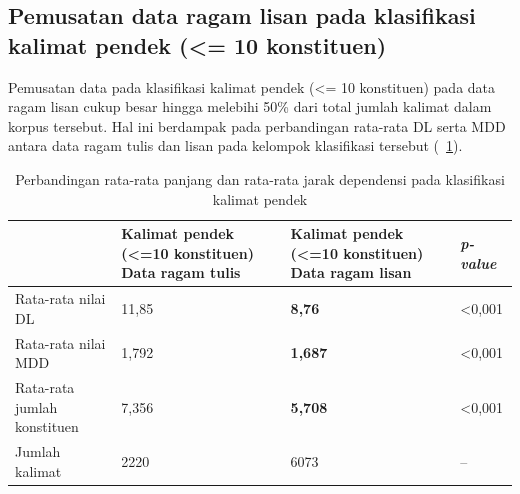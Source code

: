 \subsection{Pemusatan data ragam lisan pada klasifikasi kalimat pendek (\textless= 10 konstituen)}
Pemusatan data pada klasifikasi kalimat pendek (\textless= 10 konstituen) pada data ragam lisan cukup besar hingga melebihi 50\% dari total jumlah kalimat dalam korpus tersebut. Hal ini berdampak pada perbandingan rata-rata DL serta MDD antara data ragam tulis dan lisan pada kelompok klasifikasi tersebut (\tab~\ref{tab:DL_MDD_pendek}).

\begin{table}
\begin{center}
\begin{small}
\caption{Perbandingan rata-rata panjang dan rata-rata jarak dependensi pada klasifikasi kalimat pendek }\label{tab:DL_MDD_pendek}
  \begin{tabular}{ | p{3.2cm} | p{3.2cm} | p{3.2cm} | p{2cm} |}
    \hline
 & Kalimat pendek \newline (\textless =10 konstituen) \newline Data ragam tulis & Kalimat pendek \newline (\textless =10 konstituen) \newline Data ragam lisan & \textit{p-value} \\ \hline
 Rata-rata nilai DL & 11,85 & \textbf{8,76} & \textless 0,001 \\ \hline
 Rata-rata nilai MDD & 1,792 & \textbf{1,687} & \textless 0,001 \\ \hline
 Rata-rata jumlah konstituen & 7,356 & \textbf{5,708} & \textless 0,001 \\ \hline
 Jumlah kalimat & 2220 & 6073 & -- \\ \hline
   \end{tabular}
   \end{small}
\end{center}
\end{table}

